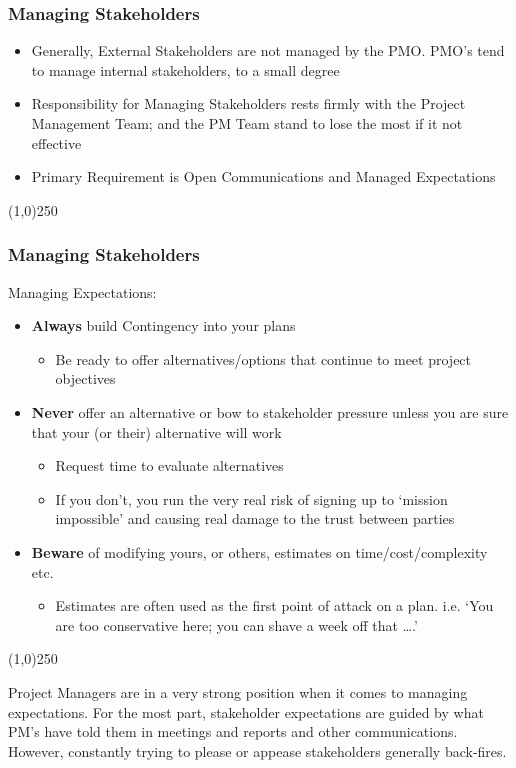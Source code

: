 \begin{frame}
\frametitle{Managing Stakeholders}
\begin{itemize}
	\item Generally, External Stakeholders are not managed by the PMO.  PMO's tend to manage internal stakeholders, to a small degree
	\item Responsibility for Managing Stakeholders rests firmly with the Project Management Team; and the PM Team stand to lose the most if it not effective
	\item Primary Requirement is Open Communications and Managed Expectations
\end{itemize}
\end{frame}
\begin{center}\line(1,0){250}\end{center}



\begin{frame}
\frametitle{Managing Stakeholders}
Managing Expectations:\\
\begin{itemize}
	\item \textbf{Always} build Contingency into your plans
		\begin{itemize}
			\item Be ready to offer alternatives/options that continue to meet project objectives
		\end{itemize}
	\item \textbf{Never} offer an alternative or bow to stakeholder pressure unless you are sure that your (or their) alternative will work
			\begin{itemize}
			\item Request time to evaluate alternatives
			\item If you don't, you run the very real risk of signing up to `mission impossible' and causing real damage to the trust between parties
			\end{itemize}
	\item \textbf{Beware} of modifying yours, or others, estimates on time/cost/complexity etc.
		\begin{itemize}
		\item Estimates are often used as the first point of attack on a plan. i.e. `You are too conservative here; you can shave a week off that \ldots.'
		\end{itemize} 
\end{itemize}
\end{frame}
\begin{center}\line(1,0){250}\end{center}
Project Managers are in a very strong position when it comes to managing expectations.  For the most part, stakeholder expectations are guided by what PM's have told them in meetings and reports and other communications.  However, constantly trying to please or appease stakeholders generally back-fires.  


